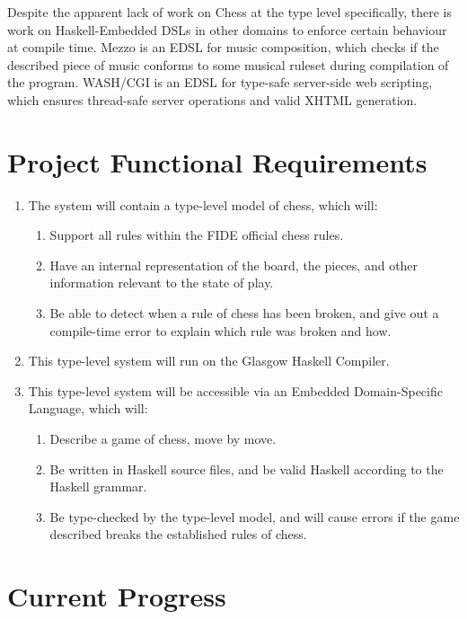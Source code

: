 \documentclass[12pt, a4paper]{scrartcl}
\begin{document}
Despite the apparent lack of work on Chess at the type level specifically, there is work on Haskell-Embedded DSLs in other domains to enforce certain behaviour at compile time. Mezzo\cite{mezzohaskellsymposium} is an EDSL for music composition, which checks if the described piece of music conforms to some musical ruleset during compilation of the program. WASH/CGI\cite{washcgi} is an EDSL for type-safe server-side web scripting, which ensures thread-safe server operations and valid XHTML generation.

\section{Project Functional Requirements}

\begin{enumerate}
    \item The system will contain a type-level model of chess, which will:
          \begin{enumerate}
              \item Support all rules within the FIDE official chess rules.
              \item Have an internal representation of the board, the pieces, and other information relevant to the state of play.
              \item Be able to detect when a rule of chess has been broken, and give out a compile-time error to explain which rule was broken and how.
          \end{enumerate}
    \item This type-level system will run on the Glasgow Haskell Compiler.
    \item This type-level system will be accessible via an Embedded Domain-Specific Language, which will:
          \begin{enumerate}
              \item Describe a game of chess, move by move.
              \item Be written in Haskell source files, and be valid Haskell according to the Haskell grammar\cite{2010langreport}.
              \item Be type-checked by the type-level model, and will cause errors if the game described breaks the established rules of chess.
          \end{enumerate}
\end{enumerate}

\section{Current Progress}
\end{document}

